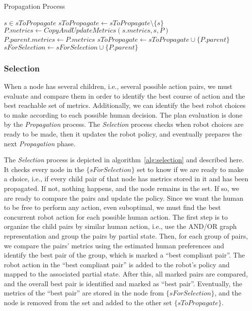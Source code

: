 \begin{algorithm}[h]
\caption{Propagation Process}\label{alg:propagation}
\begin{algorithmic}[1]

    \State $s \in sToPropagate$
    \State $sToPropagate \gets sToPropagate \setminus \{s\}$
        \State $P.metrics \gets CopyAndUpdateMetrics(s.metrics, s, P)$
            \State $P.parent.metrics \gets P.metrics$
            \State $sToPropagate \gets sToPropagate \cup \{P.parent\}$
        \Else
            \State $sForSelection \gets sForSelection \cup \{P.parent\}$
        \EndIf
    \EndFor
\EndWhile

\end{algorithmic}
\end{algorithm}


    \subsubsection*{Selection}

When a node has several children, i.e., several possible action pairs, we must evaluate and compare them in order to identify the best course of action and the best reachable set of metrics. Additionally, we can identify the best robot choices to make according to each possible human decision. 
The plan evaluation is done by the \textit{Propagation} process. The \textit{Selection} process checks when robot choices are ready to be made, then it updates the robot policy, and eventually prepares the next \textit{Propagation} phase. 

The \textit{Selection} process is depicted in algorithm~\ref{alg:selection} and described here. It checks every node in the $\{sForSelection\}$ set to know if we are ready to make a choice, i.e., if every child pair of that node has metrics stored in it and has been propagated. 
If not, nothing happens, and the node remains in the set.
If so, we are ready to compare the pairs and update the policy. Since we want the human to be free to perform any action, even suboptimal, we must find the best concurrent robot action for each possible human action. The first step is to organize the child pairs by similar human action, i.e., use the AND/OR graph representation and group the pairs by partial state. Then, for each group of pairs, we compare the pairs' metrics using the estimated human preferences and identify the best pair of the group, which is marked a ``best compliant pair''. The robot action in the ``best compliant pair'' is added to the robot's policy and mapped to the associated partial state. After this, all marked pairs are compared, and the overall best pair is identified and marked as ``best pair''. Eventually, the metrics of the ``best pair'' are stored in the node from $\{sForSelection\}$, and the node is removed from the set and added to the other set $\{sToPropagate\}$.

